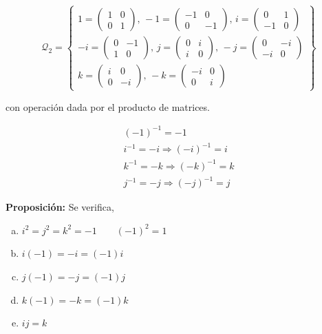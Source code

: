 \documentclass{article}
\begin{document}
\[
\mathcal{Q}_2=\left\lbrace \begin{array}{c}
1=
\begin{pmatrix}
1 & 0 \\
0 & 1
\end{pmatrix},\,
-1=
\begin{pmatrix}
-1 & 0 \\
0 & -1
\end{pmatrix}, \,
i=
\begin{pmatrix}
0 & 1 \\
-1 & 0
\end{pmatrix} \\
-i=
\begin{pmatrix}
0 & -1 \\
1 & 0
\end{pmatrix}, \,
j=
\begin{pmatrix}
0 & i \\
i & 0
\end{pmatrix},\,
-j=
\begin{pmatrix}
0 & -i \\
-i & 0
\end{pmatrix}\\
k=
\begin{pmatrix}
i & 0 \\
0 & -i
\end{pmatrix}, \,
-k=
\begin{pmatrix}
-i & 0 \\
0 & i
\end{pmatrix}

\end{array} \right\rbrace
\]

con operación dada por el producto de matrices.

\begin{gather*}
(-1)^{-1}=-1 \\
i^{-1}=-i \Rightarrow (-i)^{-1}=i \\
k^{-1}=-k \Rightarrow (-k)^{-1}=k \\
j^{-1}=-j \Rightarrow (-j)^{-1}=j
\end{gather*}

\textbf{Proposición:} Se verifica,

\begin{enumerate}[a)]
\item $i^2=j^2=k^2=-1 \qquad (-1)^2=1$
\item $i(-1)=-i=(-1)i$
\item $j(-1)=-j=(-1)j$
\item $k(-1)=-k=(-1)k$
\item $ij=k$
\end{enumerate}
\end{document}

